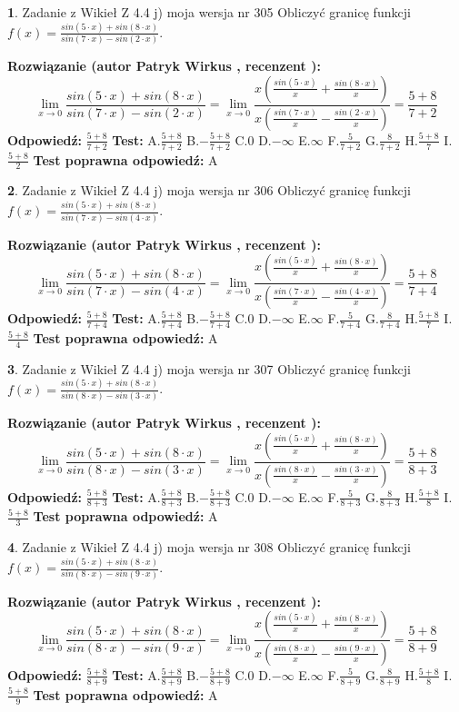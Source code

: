 \documentclass[12pt, a4paper]{article}
\theoremstyle{definition} %
\newtheorem{zad}{}
\newcommand{\zadStart}[1]{\begin{zad}#1\newline}
\newcommand{\zadStop}{\end{zad}}
\newcommand{\rozwStart}[2]{\noindent \textbf{Rozwiązanie (autor #1 , recenzent #2): }\newline}
\newcommand{\rozwStop}{\newline}
\newcommand{\odpStart}{\noindent \textbf{Odpowiedź:}\newline}
\newcommand{\odpStop}{\newline}
\newcommand{\testStart}{\noindent \textbf{Test:}\newline}
\newcommand{\testStop}{\newline}
\newcommand{\kluczStart}{\noindent \textbf{Test poprawna odpowiedź:}\newline}
\newcommand{\kluczStop}{\newline}
\begin{document}
\zadStart{Zadanie z Wikieł Z 4.4 j) moja wersja nr 305}
Obliczyć granicę funkcji $f(x)=\frac{sin(5\cdot x) +sin(8\cdot x)}{sin(7\cdot x) -sin(2\cdot x)}$.
\zadStop
\rozwStart{Patryk Wirkus}{}
$$\lim\limits_{x\to 0}\frac{sin(5\cdot x) +sin(8\cdot x)}{sin(7\cdot x) -sin(2\cdot x)}=\lim\limits_{x\to 0}\frac{x(\frac{sin(5\cdot x)}{x}+\frac{sin(8\cdot x)}{x})}{x(\frac{sin(7\cdot x)}{x}-\frac{sin(2\cdot x)}{x})}=\frac{5+8}{7+2}$$
\rozwStop
\odpStart
$\frac{5+8}{7+2}$
\odpStop
\testStart
A.$\frac{5+8}{7+2}$
B.$-\frac{5+8}{7+2}$
C.$0$
D.$-\infty$
E.$\infty$
F.$\frac{5}{7+2}$
G.$\frac{8}{7+2}$
H.$\frac{5+8}{7}$
I.$\frac{5+8}{2}$
\testStop
\kluczStart
A
\kluczStop



\zadStart{Zadanie z Wikieł Z 4.4 j) moja wersja nr 306}
Obliczyć granicę funkcji $f(x)=\frac{sin(5\cdot x) +sin(8\cdot x)}{sin(7\cdot x) -sin(4\cdot x)}$.
\zadStop
\rozwStart{Patryk Wirkus}{}
$$\lim\limits_{x\to 0}\frac{sin(5\cdot x) +sin(8\cdot x)}{sin(7\cdot x) -sin(4\cdot x)}=\lim\limits_{x\to 0}\frac{x(\frac{sin(5\cdot x)}{x}+\frac{sin(8\cdot x)}{x})}{x(\frac{sin(7\cdot x)}{x}-\frac{sin(4\cdot x)}{x})}=\frac{5+8}{7+4}$$
\rozwStop
\odpStart
$\frac{5+8}{7+4}$
\odpStop
\testStart
A.$\frac{5+8}{7+4}$
B.$-\frac{5+8}{7+4}$
C.$0$
D.$-\infty$
E.$\infty$
F.$\frac{5}{7+4}$
G.$\frac{8}{7+4}$
H.$\frac{5+8}{7}$
I.$\frac{5+8}{4}$
\testStop
\kluczStart
A
\kluczStop



\zadStart{Zadanie z Wikieł Z 4.4 j) moja wersja nr 307}
Obliczyć granicę funkcji $f(x)=\frac{sin(5\cdot x) +sin(8\cdot x)}{sin(8\cdot x) -sin(3\cdot x)}$.
\zadStop
\rozwStart{Patryk Wirkus}{}
$$\lim\limits_{x\to 0}\frac{sin(5\cdot x) +sin(8\cdot x)}{sin(8\cdot x) -sin(3\cdot x)}=\lim\limits_{x\to 0}\frac{x(\frac{sin(5\cdot x)}{x}+\frac{sin(8\cdot x)}{x})}{x(\frac{sin(8\cdot x)}{x}-\frac{sin(3\cdot x)}{x})}=\frac{5+8}{8+3}$$
\rozwStop
\odpStart
$\frac{5+8}{8+3}$
\odpStop
\testStart
A.$\frac{5+8}{8+3}$
B.$-\frac{5+8}{8+3}$
C.$0$
D.$-\infty$
E.$\infty$
F.$\frac{5}{8+3}$
G.$\frac{8}{8+3}$
H.$\frac{5+8}{8}$
I.$\frac{5+8}{3}$
\testStop
\kluczStart
A
\kluczStop



\zadStart{Zadanie z Wikieł Z 4.4 j) moja wersja nr 308}
Obliczyć granicę funkcji $f(x)=\frac{sin(5\cdot x) +sin(8\cdot x)}{sin(8\cdot x) -sin(9\cdot x)}$.
\zadStop
\rozwStart{Patryk Wirkus}{}
$$\lim\limits_{x\to 0}\frac{sin(5\cdot x) +sin(8\cdot x)}{sin(8\cdot x) -sin(9\cdot x)}=\lim\limits_{x\to 0}\frac{x(\frac{sin(5\cdot x)}{x}+\frac{sin(8\cdot x)}{x})}{x(\frac{sin(8\cdot x)}{x}-\frac{sin(9\cdot x)}{x})}=\frac{5+8}{8+9}$$
\rozwStop
\odpStart
$\frac{5+8}{8+9}$
\odpStop
\testStart
A.$\frac{5+8}{8+9}$
B.$-\frac{5+8}{8+9}$
C.$0$
D.$-\infty$
E.$\infty$
F.$\frac{5}{8+9}$
G.$\frac{8}{8+9}$
H.$\frac{5+8}{8}$
I.$\frac{5+8}{9}$
\testStop
\kluczStart
A
\kluczStop
\end{document}

